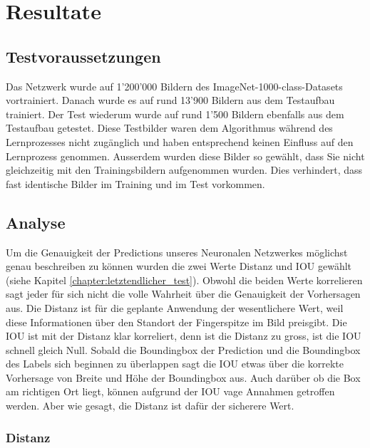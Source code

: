 \newpage
\section{Resultate}
\label{chapter:resultate}
\subsection{Testvoraussetzungen}
Das Netzwerk wurde auf 1'200'000 Bildern des ImageNet-1000-class-Datasets vortrainiert.
Danach wurde es auf rund 13'900 Bildern aus dem Testaufbau \cite{TabeasFingertracking} trainiert. 
Der Test wiederum wurde auf rund 1'500 Bildern ebenfalls aus dem Testaufbau \cite{TabeasFingertracking} getestet. 
Diese Testbilder waren dem Algorithmus während des Lernprozesses nicht zugänglich und haben entsprechend keinen Einfluss auf den Lernprozess genommen. 
Ausserdem wurden diese Bilder so gewählt, dass Sie nicht gleichzeitig mit den Trainingsbildern aufgenommen wurden. 
Dies verhindert, dass fast identische Bilder im Training und im Test vorkommen. 

\subsection{Analyse}
Um die Genauigkeit der Predictions unseres Neuronalen Netzwerkes möglichst genau beschreiben zu können wurden die zwei Werte Distanz und IOU gewählt (siehe Kapitel \ref{chapter:letztendlicher_test}). 
Obwohl die beiden Werte korrelieren sagt jeder für sich nicht die volle Wahrheit über die Genauigkeit der Vorhersagen aus. 
Die Distanz ist für die geplante Anwendung der wesentlichere Wert, weil diese Informationen über den Standort der Fingerspitze im Bild preisgibt.
Die IOU ist mit der Distanz klar korreliert, denn ist die Distanz zu gross, ist die IOU schnell gleich Null. 
Sobald die Boundingbox der Prediction und die Boundingbox des Labels sich beginnen zu überlappen sagt die IOU etwas über die korrekte Vorhersage von Breite und Höhe der Boundingbox aus. Auch darüber ob die Box am richtigen Ort liegt, können aufgrund der IOU vage Annahmen getroffen werden. Aber wie gesagt, die Distanz ist dafür der sicherere Wert. 

\subsubsection{Distanz}


